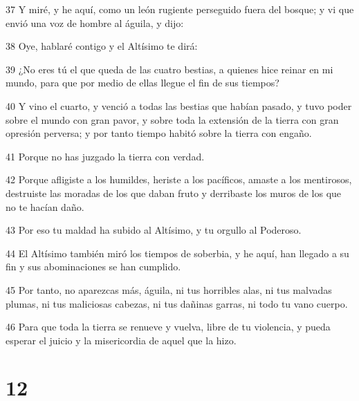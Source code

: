 \par 37 Y miré, y he aquí, como un león rugiente perseguido fuera del bosque; y vi que envió una voz de hombre al águila, y dijo:
\par 38 Oye, hablaré contigo y el Altísimo te dirá:
\par 39 ¿No eres tú el que queda de las cuatro bestias, a quienes hice reinar en mi mundo, para que por medio de ellas llegue el fin de sus tiempos?
\par 40 Y vino el cuarto, y venció a todas las bestias que habían pasado, y tuvo poder sobre el mundo con gran pavor, y sobre toda la extensión de la tierra con gran opresión perversa; y por tanto tiempo habitó sobre la tierra con engaño.
\par 41 Porque no has juzgado la tierra con verdad.
\par 42 Porque afligiste a los humildes, heriste a los pacíficos, amaste a los mentirosos, destruiste las moradas de los que daban fruto y derribaste los muros de los que no te hacían daño.
\par 43 Por eso tu maldad ha subido al Altísimo, y tu orgullo al Poderoso.
\par 44 El Altísimo también miró los tiempos de soberbia, y he aquí, han llegado a su fin y sus abominaciones se han cumplido.
\par 45 Por tanto, no aparezcas más, águila, ni tus horribles alas, ni tus malvadas plumas, ni tus maliciosas cabezas, ni tus dañinas garras, ni todo tu vano cuerpo.
\par 46 Para que toda la tierra se renueve y vuelva, libre de tu violencia, y pueda esperar el juicio y la misericordia de aquel que la hizo.

\chapter{12}

